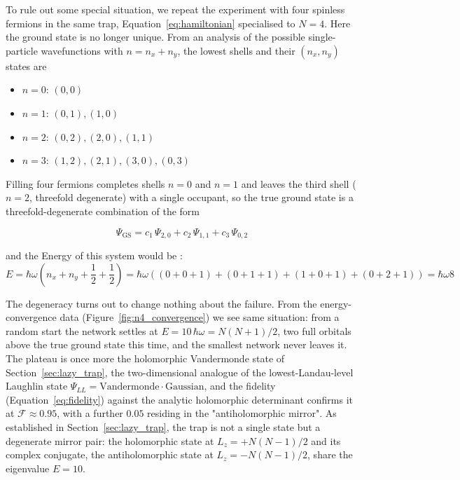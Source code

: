 \documentclass[a4paper,11pt,twoside]{article}
\begin{document}
To rule out some special situation, we repeat the experiment with four spinless fermions in the same trap, Equation~\ref{eq:hamiltonian} specialised to $N=4$. Here the ground state is no longer unique. From an analysis of the possible single-particle wavefunctions with $n = n_x + n_y$, the lowest shells and their $(n_x, n_y)$ states are

\begin{itemize}
    \item $n = 0$: $(0,0)$
    \item $n = 1$: $(0,1), (1,0)$
    \item $n = 2$: $(0,2), (2,0), (1,1)$
    \item $n = 3$: $(1,2), (2,1), (3,0), (0,3)$
\end{itemize}

Filling four fermions completes shells $n=0$ and $n=1$ and leaves the third shell ($n=2$, threefold degenerate) with a single occupant, so the true ground state is a threefold-degenerate combination of the form

\begin{equation}
\Psi_{\mathrm{GS}}
=
c_1\,\Psi_{2,0}
+
c_2\,\Psi_{1,1}
+
c_3\,\Psi_{0,2}
\end{equation}

and the Energy of this system would be : 
\begin{equation}
    E = \hbar \omega ( n_x + n_y + \frac{1}{2} + \frac{1}{2}) =  \hbar \omega  (( 0 + 0 + 1 ) + ( 0 + 1 + 1  )  +  ( 1 + 0 + 1  ) + ( 0 + 2 + 1  )) =  \hbar \omega 8
\end{equation}


The degeneracy turns out to change nothing about the failure. From the energy-convergence data (Figure~\ref{fig:n4_convergence}) we see same situation:  from a random start the network settles at $E = 10\,\hbar\omega = N(N+1)/2$, two full orbitals above the true ground state this time, and the smallest network never leaves it. The plateau is once more the holomorphic Vandermonde state of Section~\ref{sec:lazy_trap}, the two-dimensional analogue of the lowest-Landau-level Laughlin state $\Psi_{LL} = \text{Vandermonde}\cdot\text{Gaussian}$, and the fidelity (Equation~\ref{eq:fidelity}) against the analytic holomorphic determinant confirms it at $\mathcal{F} \approx 0.95$, with a further $0.05$ residing in the "antiholomorphic mirror". As established in Section~\ref{sec:lazy_trap}, the trap is not a single state but a degenerate mirror pair: the holomorphic state at $L_z = +N(N-1)/2$ and its complex conjugate, the antiholomorphic state at $L_z = -N(N-1)/2$, share the eigenvalue $E=10$.
\end{document}
